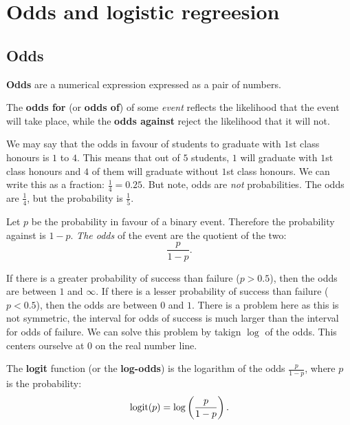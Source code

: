 \chapter{Odds and logistic regreesion}
\section{Odds}

\begin{definition}[Odds]
    \textbf{Odds} are a numerical expression expressed as a pair of numbers.
\end{definition}

The \textbf{odds for} (or \textbf{odds of}) of some \emph{event}
reflects the likelihood that the event will take place,
while the \textbf{odds against} reject the likelihood that it will not.

\begin{example}
    We may say that the odds in favour of students to graduate with $1$st class
    honours is $1$ to $4$.
    This means that out of $5$ students, $1$ will graduate with $1$st class
    honours and $4$ of them will graduate without $1$st class honours.
    We can write this as a fraction: $\frac14 = 0.25$.
    But note, odds are \emph{not} probabilities.
    The odds are $\frac14$, but the probability is $\frac15$.
\end{example}

Let $p$ be the probability in favour of a binary event.
Therefore the probability against is $1 - p$.
\emph{The odds} of the event are the quotient of the two:
\[
    \frac{p}{1-p}.
\]

If there is a greater probability of success than failure ($p > 0.5$),
then the odds are between $1$ and $\infty$.
If there is a lesser probability of success than failure ($p < 0.5$),
then the odds are between $0$ and $1$.
There is a problem here as this is not symmetric, the interval
for odds of success is much larger than the interval for odds of failure.
We can solve this problem by takign $\log$ of the odds.
This centers ourselve at $0$ on the real number line.

\begin{definition}
    The \textbf{logit} function (or the \textbf{log-odds})
    is the logarithm of the odds $\frac{p}{1 - p}$, where
    $p$ is the probability:
    \[
        \operatorname{logit}(p) = \log\left(\frac{p}{1 - p}\right).
    \]
\end{definition}

